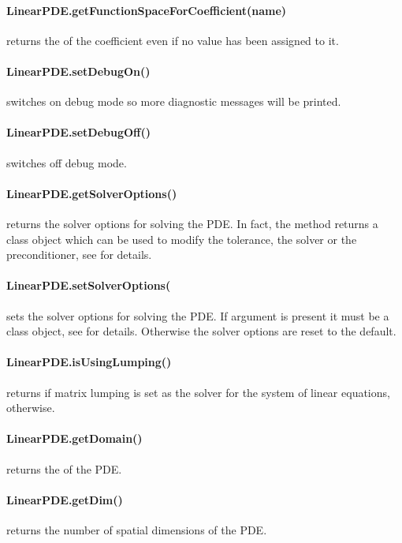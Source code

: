 \paragraph{LinearPDE.getFunctionSpaceForCoefficient(name)}
returns the \FunctionSpace of the coefficient  even if no value has
been assigned to it.


\paragraph{LinearPDE.setDebugOn()}
switches on debug mode so more diagnostic messages will be printed.


\paragraph{LinearPDE.setDebugOff()}
switches off debug mode.


\paragraph{LinearPDE.getSolverOptions()}
returns the solver options for solving the PDE. In fact, the method returns
a \SolverOptions class object which can be used to modify the tolerance,
the solver or the preconditioner, see  for details.


\paragraph{LinearPDE.setSolverOptions(
}
sets the solver options for solving the PDE. If argument  is
present it must be a \SolverOptions class object, see 
for details. Otherwise the solver options are reset to the default.


\paragraph{LinearPDE.isUsingLumping()}
returns \True if matrix lumping is set as the solver for the system of linear
equations, \False otherwise.


\paragraph{LinearPDE.getDomain()}
returns the \Domain of the PDE.


\paragraph{LinearPDE.getDim()}
returns the number of spatial dimensions of the PDE.


